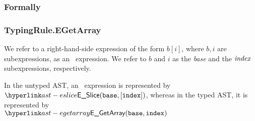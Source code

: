\subsubsection{Formally}
\begin{mathpar}
\end{mathpar}

\subsubsection{TypingRule.EGetArray\label{sec:TypingRule.EGetArray}}
\hypertarget{def-arrayaccess}{}
\begin{definition}
We refer to a right-hand-side expression of the form $b[i]$,
where $b, i$ are subexpressions, as an \arrayaccess\ expression.
We refer to $b$ and $i$ as the \emph{base}
and the $\emph{index}$ subexpressions, respectively.

In the untyped AST, an \arrayaccess\ expression is represented by \\
$\ESlice(\vbase, [\vindex])$, whereas in the typed AST,
it is represented by \\
$\EGetArray(\vbase, \vindex)$
\end{definition}

